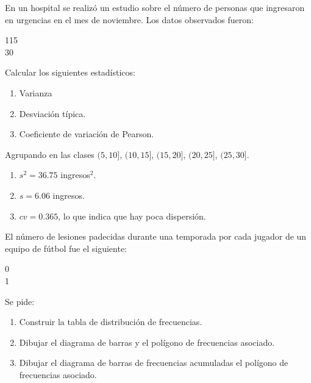 {En un hospital se realizó un estudio sobre el número de personas que ingresaron en urgencias en el mes de noviembre. Los datos observados fueron:
\begin{center}
115               \\
30              
\end{center}
Calcular los siguientes estadísticos:
\begin{enumerate}
\item Varianza
\item Desviación típica.
\item Coeficiente de variación de Pearson.
\end{enumerate}
}
{
Agrupando en las clases $(5,10]$, $(10,15]$, $(15,20]$, $(20,25]$, $(25,30]$.
\begin{enumerate}
\item $s^2 = 36.75$ ingresos$^2$.
\item $s=6.06$ ingresos.
\item $cv=0.365$, lo que indica que hay poca dispersión. 
\end{enumerate}
}
{}


{El número de lesiones padecidas durante una temporada por cada jugador de un equipo de fútbol fue el siguiente:
\begin{center}
0            \\
1           
\end{center}
Se pide:
\begin{enumerate}
\item Construir la tabla de distribución de frecuencias.
\item Dibujar el diagrama de barras y el polígono de frecuencias asociado. 
\item Dibujar el diagrama de barras de frecuencias acumuladas el polígono de frecuencias asociado.
\end{enumerate}
}
{
}
{}


